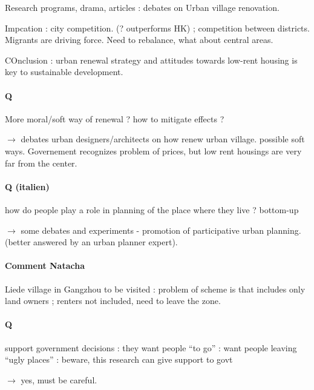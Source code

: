 Research programs, drama, articles : debates on Urban village renovation.

Impcation : city competition. (? outperforms HK) ; competition between districts. Migrants are driving force. Need to rebalance, what about central areas.

COnclusion : urban renewal strategy and attitudes towards low-rent housing is key to sustainable development.

\paragraph{Q}

More moral/soft way of renewal ? how to mitigate effects ?

$\rightarrow$ debates urban designers/architects on how renew urban village. possible soft ways. Governement recognizes problem of prices, but low rent housings are very far from the center.

\paragraph{Q (italien)}

how do people play a role in planning of the place where they live ? bottom-up

$\rightarrow$ some debates and experiments - promotion of participative urban planning. (better answered by an urban planner expert).

\paragraph{Comment Natacha}

Liede village in Gangzhou to be visited : problem of scheme is that includes only land owners ; renters not included, need to leave the zone.

\paragraph{Q}

support government decisions : they want people ``to go'' : want people leaving ``ugly places'' : beware, this research can give support to govt

$\rightarrow$ yes, must be careful.































